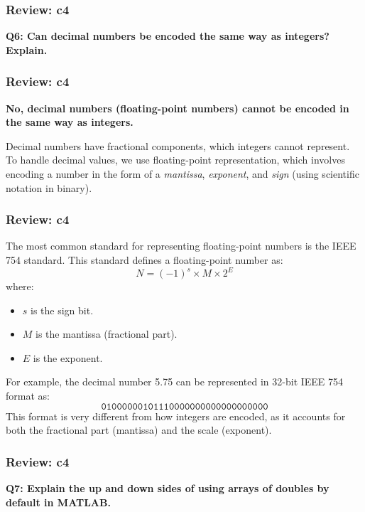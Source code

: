 \documentclass[
	11pt, %
]{beamer}
\begin{document}


\begin{frame}
	\frametitle{Review: c4}

	\textbf{Q6: Can decimal numbers be encoded the same way as integers? Explain.}

\end{frame}



\begin{frame}
	\frametitle{Review: c4}

\textbf{No, decimal numbers (floating-point numbers) cannot be encoded in the same way as integers.}

Decimal numbers have fractional components, which integers cannot represent. To handle decimal values, we use floating-point representation, which involves encoding a number in the form of a \textit{mantissa}, \textit{exponent}, and \textit{sign} (using scientific notation in binary).

\end{frame}


\begin{frame}
	\frametitle{Review: c4}

The most common standard for representing floating-point numbers is the IEEE 754 standard. This standard defines a floating-point number as:
\[
N = (-1)^s \times M \times 2^E
\]
where:
\begin{itemize}
    \item $s$ is the sign bit.
    \item $M$ is the mantissa (fractional part).
    \item $E$ is the exponent.
\end{itemize}

For example, the decimal number 5.75 can be represented in 32-bit IEEE 754 format as:
\[
\texttt{01000000101110000000000000000000}
\]
This format is very different from how integers are encoded, as it accounts for both the fractional part (mantissa) and the scale (exponent).


\end{frame}


\begin{frame}
	\frametitle{Review: c4}

	\textbf{Q7: Explain the up and down sides of using arrays of doubles by default in MATLAB.}

\end{frame}
\end{document}
